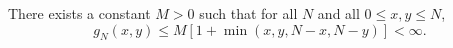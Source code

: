 There exists a constant $M > 0$ such that for all $N$ and all $0 \leq x, y \leq N$,
$$g_N(x,y) \leq M[1 + \min(x, y, N-x, N-y)] < \infty.$$
